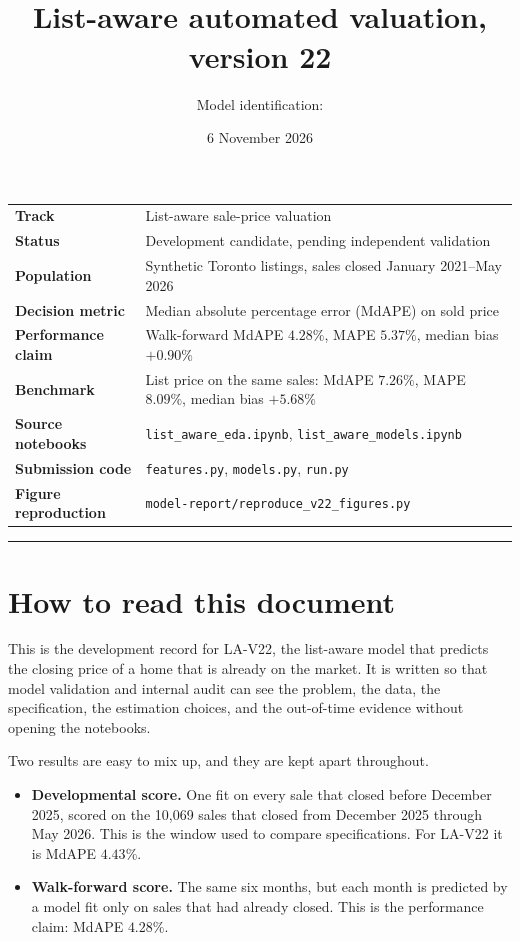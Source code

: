 \documentclass[11pt]{article}
\title{\textcolor{navy}{\doctype}\\[4pt]
\large List-aware automated valuation, version 22}
\author{Model identification: \modelid}
\date{6 November 2026}
\newcommand{\modelid}{LA-V22}
\begin{document}
\maketitle
\thispagestyle{empty}

\begin{center}
\small
\begin{tabular}{@{}>{\bfseries}l p{11.2cm}@{}}
Track & List-aware sale-price valuation \\
Status & Development candidate, pending independent validation \\
Population & Synthetic Toronto listings, sales closed January 2021--May 2026 \\
Decision metric & Median absolute percentage error (MdAPE) on sold price \\
Performance claim & Walk-forward MdAPE \(4.28\%\), MAPE \(5.37\%\), median bias \(+0.90\%\) \\
Benchmark & List price on the same sales: MdAPE \(7.26\%\), MAPE \(8.09\%\), median bias \(+5.68\%\) \\
Source notebooks & \texttt{list\_aware\_eda.ipynb}, \texttt{list\_aware\_models.ipynb} \\
Submission code & \texttt{features.py}, \texttt{models.py}, \texttt{run.py} \\
Figure reproduction & \texttt{model-report/reproduce\_v22\_figures.py} \\
\end{tabular}
\end{center}

\vspace{4pt}
{\color{rule}\hrule}
\vspace{8pt}

\section*{How to read this document}

This is the development record for \modelid, the list-aware model that predicts the closing price of a home that is already on the market. It is written so that model validation and internal audit can see the problem, the data, the specification, the estimation choices, and the out-of-time evidence without opening the notebooks.

Two results are easy to mix up, and they are kept apart throughout.

\begin{itemize}
\item \textbf{Developmental score.} One fit on every sale that closed before December 2025, scored on the 10,069 sales that closed from December 2025 through May 2026. This is the window used to compare specifications. For \modelid{} it is MdAPE \(4.43\%\).
\item \textbf{Walk-forward score.} The same six months, but each month is predicted by a model fit only on sales that had already closed. This is the performance claim: MdAPE \(4.28\%\).
\end{itemize}
\end{document}

